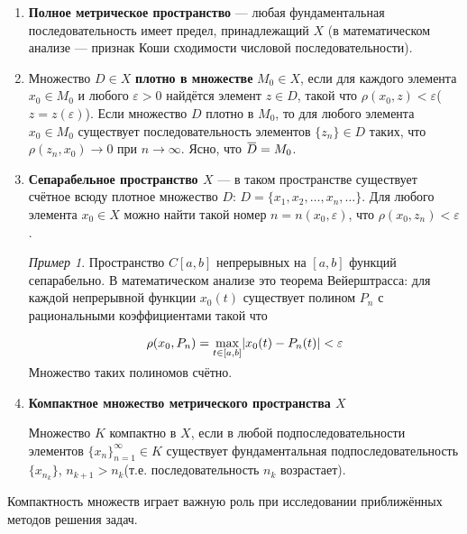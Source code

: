 \documentclass[12pt,a4paper,titlepage, oneside]{book}
\newcommand{\overbar}[1]{\mkern 1.5mu\overline{\mkern-1.5mu#1\mkern-1.5mu}\mkern 1.5mu}
\theoremstyle{definition}
\theoremstyle{plain}
\theoremstyle{remark}
\theoremstyle{remark}
\newtheorem*{example}{Пример}
\theoremstyle{remark}
\theoremstyle{remark}
\theoremstyle{plain}
\theoremstyle{plain}
\begin{document}
\begin{enumerate}

	\item \textbf{Полное метрическое пространство} --- любая фундаментальная последовательность имеет предел, принадлежащий $X$ (в математическом анализе --- признак Коши сходимости числовой последовательности).

	\item Множество $D \in X$ \textbf{плотно в множестве} $ M_0 \in X$, если для каждого элемента $x_0 \in M_0$ и любого $\varepsilon > 0$ найдётся элемент $z \in D$, такой что $\rho(x_0, z) < \varepsilon$($z = z(\varepsilon)$). Если множество $D$ плотно в $M_0$, то для любого элемента $x_0 \in  M_0$ существует последовательность элементов $\lbrace z_n \rbrace \in D$ таких, что $\rho(z_n, x_0) \to 0$ при $n \to \infty$. Ясно, что $\overbar{D} = M_0$.

	\item \textbf{Сепарабельное пространство $X$} --- в таком пространстве существует счётное всюду плотное множество $D$: $D=\lbrace x_1,x_2,\ldots,x_n,\ldots \rbrace$. Для любого элемента $x_0 \in X$ можно найти такой номер $n = n(x_0,\varepsilon)$, что $\rho(x_0, z_n) < \varepsilon$.

	\begin{example}	
	Пространство $C[a,b]$ непрерывных на $[a,b]$ функций сепарабельно. В математическом анализе это теорема Вейерштрасса: для каждой непрерывной функции $x_0(t)$ существует полином $P_n$ с рациональными коэффициентами такой что
	
	\begin{equation*}
	\rho(x_0, P_n)=\smash{\displaystyle\max_{t \in [a,b]}} |x_0(t)-P_n(t)| < \varepsilon
	\end{equation*}

	Множество таких полиномов счётно.
	\end{example}

	\item \textbf{Компактное множество метрического пространства $X$}

	Множество $K$ компактно в $X$, если в любой подпоследовательности элементов $\lbrace x_n \rbrace_{n=1}^{\infty} \in K$ существует фундаментальная подпоследовательность $\lbrace x_{n_k} \rbrace$, $n_{k+1}>n_k$(т.е. последовательность $n_k$ возрастает).

\end{enumerate}


Компактность множеств играет важную роль при исследовании приближённых методов решения задач.
\end{document}
